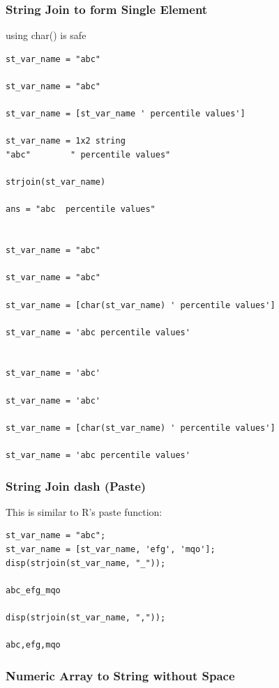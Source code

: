 \documentclass[
]{book}
\begin{document}
\hypertarget{string-join-to-form-single-element}{%
\subsubsection{String Join to form Single Element}\label{string-join-to-form-single-element}}

using char() is safe

\begin{verbatim}
st_var_name = "abc"

st_var_name = "abc"

st_var_name = [st_var_name ' percentile values']

st_var_name = 1x2 string    
"abc"        " percentile values"    

strjoin(st_var_name)

ans = "abc  percentile values"


st_var_name = "abc"

st_var_name = "abc"

st_var_name = [char(st_var_name) ' percentile values']

st_var_name = 'abc percentile values'


st_var_name = 'abc'

st_var_name = 'abc'

st_var_name = [char(st_var_name) ' percentile values']

st_var_name = 'abc percentile values'
\end{verbatim}

\hypertarget{string-join-dash-paste}{%
\subsubsection{String Join dash (Paste)}\label{string-join-dash-paste}}

This is similar to R's paste function:

\begin{verbatim}
st_var_name = "abc";
st_var_name = [st_var_name, 'efg', 'mqo'];
disp(strjoin(st_var_name, "_"));

abc_efg_mqo

disp(strjoin(st_var_name, ","));

abc,efg,mqo
\end{verbatim}

\hypertarget{numeric-array-to-string-without-space}{%
\subsubsection{Numeric Array to String without Space}\label{numeric-array-to-string-without-space}}
\end{document}
